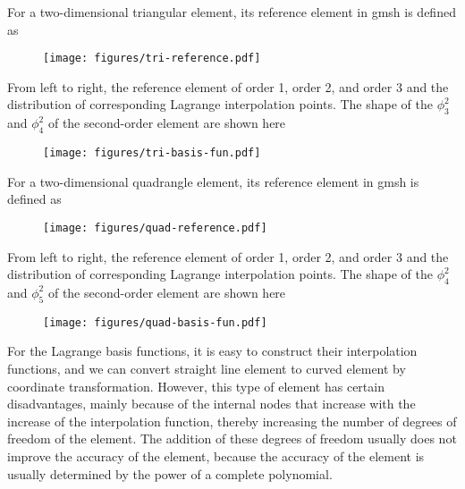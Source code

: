 \documentclass{develop-note}
\begin{document}
For a two-dimensional triangular element, its reference element in gmsh is defined as

\begin{figure}[H]
  \centering
  \texttt{[image: figures/tri-reference.pdf]}
\end{figure}

From left to right, the reference element of order 1, order 2, and order 3 and the distribution of corresponding Lagrange interpolation points. The shape of the $\phi_{3}^{2}$ and $\phi_{4}^{2}$ of the second-order element are shown here

\begin{figure}[H]
  \centering
  \texttt{[image: figures/tri-basis-fun.pdf]}
\end{figure}

For a two-dimensional quadrangle element, its reference element in gmsh is defined as

\begin{figure}[H]
  \centering
  \texttt{[image: figures/quad-reference.pdf]}
\end{figure}

From left to right, the reference element of order 1, order 2, and order 3 and the distribution of corresponding Lagrange interpolation points. The shape of the $\phi_{4}^{2}$ and $\phi_{5}^{2}$ of the second-order element are shown here

\begin{figure}[H]
  \centering
  \texttt{[image: figures/quad-basis-fun.pdf]}
\end{figure}

For the Lagrange basis functions, it is easy to construct their interpolation functions, and we can convert straight line element to curved element by coordinate transformation. However, this type of element has certain disadvantages, mainly because of the internal nodes that increase with the increase of the interpolation function, thereby increasing the number of degrees of freedom of the element. The addition of these degrees of freedom usually does not improve the accuracy of the element, because the accuracy of the element is usually determined by the power of a complete polynomial.
\end{document}
